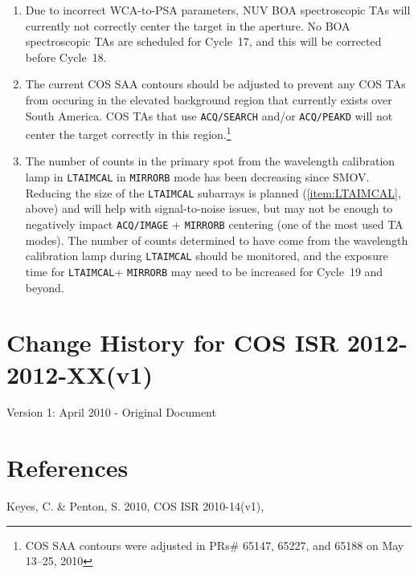 \documentclass[12pt]{article}
\newcommand{\thisISR}{2012-XX(v1)}
\begin{document}
\begin{enumerate}
\item{Due to incorrect WCA-to-PSA parameters, NUV BOA spectroscopic TAs will currently not correctly center the target in the aperture. No BOA spectroscopic TAs are scheduled for Cycle~17, and this will be corrected before Cycle~18.}
\item{The current COS SAA contours should be adjusted to prevent any COS TAs from occuring in the elevated background region that currently exists over South America. COS TAs that use \texttt{ACQ/SEARCH} and/or \texttt{ACQ/PEAKD} will not center the target correctly in this region.\footnote{COS SAA contours were adjusted in PRs\# 65147, 65227, and 65188  on May 13--25, 2010}}
\item{The number of counts in the primary spot from the wavelength calibration
lamp in \texttt{LTAIMCAL} in \texttt{MIRRORB} mode has been decreasing since SMOV. Reducing the size of the \texttt{LTAIMCAL} subarrays is planned (\ref{item:LTAIMCAL}, above) and will help with signal-to-noise issues, but may not be enough to negatively impact \texttt{ACQ/IMAGE} + \texttt{MIRRORB} centering (one of the most used TA modes). The number of counts determined to have come from the wavelength calibration lamp during \texttt{LTAIMCAL} should be monitored, and the exposure time for \texttt{LTAIMCAL}+ \texttt{MIRRORB} may need to be increased for Cycle~19 and beyond.}
\normalsize
\end{enumerate}

\clearpage
\section{Change History for COS ISR 2012-\thisISR}
Version 1: April 2010 - Original Document
\clearpage
\section{References}

\vspace{-0.23cm} \noindent Keyes, C. \& Penton, S. 2010, COS ISR 2010-14(v1), 
\end{document}
